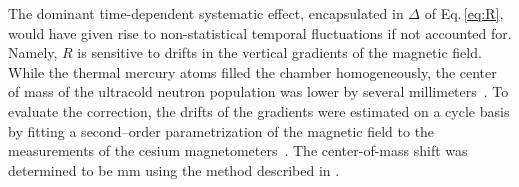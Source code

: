 The dominant time-dependent systematic effect, encapsulated in $\Delta$ of Eq.\,\eqref{eq:R}, would have given rise to non-statistical temporal fluctuations if not accounted for. Namely, $R$ is sensitive to drifts in the vertical gradients of the magnetic field. While the thermal mercury atoms filled the chamber homogeneously, the center of mass of the ultracold neutron population was lower by several millimeters~\cite{Afach2014magmoment, Afach2015, Pendlebury2015}.
To evaluate the correction, the drifts of the gradients were estimated on a cycle basis by fitting a second--order parametrization of the magnetic field to the measurements of the cesium magnetometers~\cite{WurstenThesis}. The center-of-mass shift was determined to be \unit[4]{mm} using the method described in \cite{Afach2014magmoment}.


